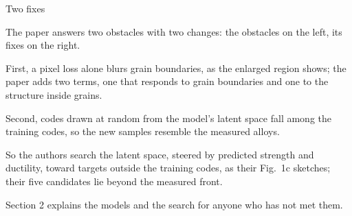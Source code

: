 \begin{frame}[source={Liao et al.\ (2026), Nat.\ Commun.\ 17, 11232, after Figs.\ 1 and 4f}]{Two fixes}
{    The paper answers two obstacles with two changes: the obstacles on the left, its fixes on the
      right.\par
    First, a pixel loss alone blurs grain boundaries, as the enlarged region shows; the paper adds two
      terms, one that responds to grain boundaries and one to the structure inside grains.\par
    Second, codes drawn at random from the model's latent space fall among the training codes, so the new
      samples resemble the measured alloys.\par
    So the authors search the latent space, steered by predicted strength and ductility, toward targets
      outside the training codes, as their Fig.~1c sketches; their five candidates lie beyond the measured
      front.\par
    Section 2 explains the models and the search for anyone who has not met them.}
\end{frame}
